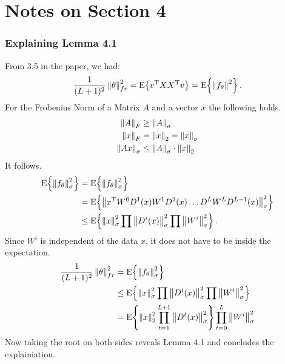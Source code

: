 \newpage
\section{Notes on Section 4}

\subsubsection{Explaining Lemma 4.1}

From 3.5 in the paper, we had:
\begin{align}
	\frac{1}{(L+1)^2} \pqnorm{\theta}{fr}{2} = \E{v^\TT X X^\TT v} = \E{\norm{f_\theta}^2}.
\end{align}
For the Frobenius Norm of a Matrix $A$ and a vector $x$ the following holds.
\begin{align}
	\frobnorm{A} &\geq \spectralnorm{A} \\
	\frobnorm{x} &= \lnorm{x} = \spectralnorm{x} \\
	\spectralnorm{Ax} &\leq \spectralnorm{A} \cdot \lnorm{x} \\
\end{align}
It follows.
\begin{align}
	\E{\spectralnorm{f_\theta}^2}
	&= 
		\E{ \spectralnorm{f_\theta}^2} \\
	&= 
		\E{ \spectralnorm{\structuredNN}^{2} } \\
	&\leq 
		\E{ \spectralnorm{x}^2 \prod \spectralnorm{D^i(x)}^2 \prod \spectralnorm{W^i}^2 }.
\end{align}
Since $W^i$ is independent of the data $x$, it does not have to be inside the expectation.
\begin{align}
\frac{1}{(L+1)^2} \frnorm{\theta}^2
	&=
		\E{\spectralnorm{f_\theta}^2}  \\	
	&\leq 
		\E{ \spectralnorm{x}^2 \prod \spectralnorm{D^i(x)}^2 \prod \spectralnorm{W^i}^2 } \\
	&=
		\E{ \lnorm{x}^2 \prod_{t=1}^{L+1} \spectralnorm{D^t(x)}^2 } \prod_{t=0}^{L} \spectralnorm{W^i}^2
\end{align}
Now taking the root on both sides reveals Lemma 4.1 and concludes the explainiation.